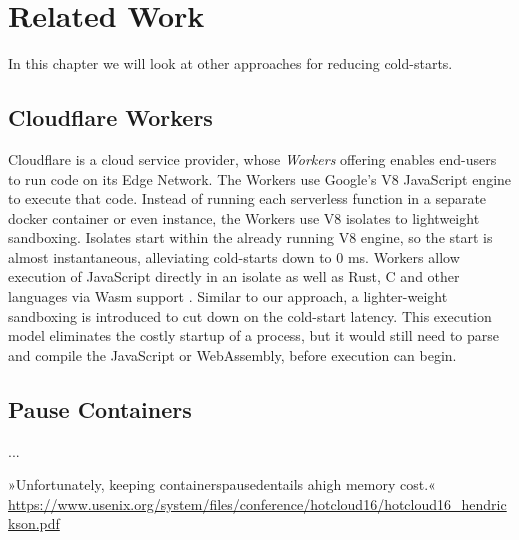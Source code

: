 \chapter{Related Work}
\label{chapter:relatedwork}

In this chapter we will look at other approaches for reducing cold-starts.

\section{Cloudflare Workers}

Cloudflare is a cloud service provider, whose \emph{Workers} offering enables end-users to run code on its Edge Network. The Workers use Google's V8 JavaScript engine to execute that code.
Instead of running each serverless function in a separate docker container or even  instance, the Workers use V8 isolates to lightweight sandboxing. Isolates start within the already running V8 engine, so the start is almost instantaneous, alleviating cold-starts down to 0 ms.
Workers allow execution of JavaScript directly in an isolate as well as Rust, C and other languages via Wasm support \cite{Cloudflare2021}.
Similar to our approach, a lighter-weight sandboxing is introduced to cut down on the cold-start latency. This execution model eliminates the costly startup of a  process, but it would still need to parse and compile the JavaScript or WebAssembly, before execution can begin.


\section{Pause Containers}

\citeauthor{Mohan2019} ...

»Unfortunately, keeping containerspausedentails ahigh memory cost.«
\url{https://www.usenix.org/system/files/conference/hotcloud16/hotcloud16_hendrickson.pdf}